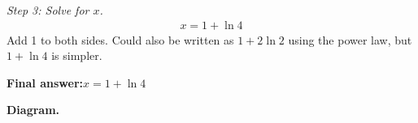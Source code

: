 \documentclass[11pt]{article}
\begin{document}
\textit{Step 3: Solve for \( x \).}
\[\begin{gathered}
x = 1 + \ln 4
\end{gathered}\]
Add 1 to both sides. Could also be written as \( 1 + 2\ln 2 \) using the power law, but \( 1 + \ln 4 \) is simpler.

\begin{answerbox}
\textbf{Final answer:}\quad \(\displaystyle  x = 1 + \ln 4 \)
\end{answerbox}
\textbf{Diagram.}

\begin{center}
\end{center}
\end{document}
